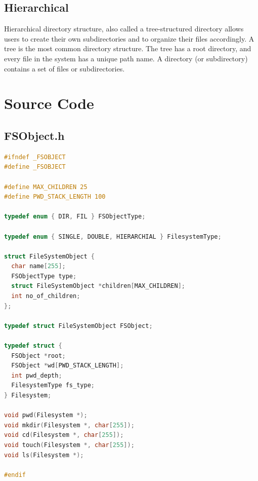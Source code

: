\documentclass[13pt,oneside]{book}
\begin{document}
\subsection{Hierarchical}
Hierarchical directory structure, also called a tree-structured directory allows
users to create their own subdirectories and to organize their files accordingly. A
tree is the most common directory structure. The tree has a root directory, and
every file in the system has a unique path name. A directory (or subdirectory)
contains a set of files or subdirectories.


\section*{Source Code}
\small
\subsection{FSObject.h}
\begin{lstlisting}[language=C]
#ifndef _FSOBJECT
#define _FSOBJECT

#define MAX_CHILDREN 25
#define PWD_STACK_LENGTH 100

typedef enum { DIR, FIL } FSObjectType;

typedef enum { SINGLE, DOUBLE, HIERARCHIAL } FilesystemType;

struct FileSystemObject {
  char name[255];
  FSObjectType type;
  struct FileSystemObject *children[MAX_CHILDREN];
  int no_of_children;
};

typedef struct FileSystemObject FSObject;

typedef struct {
  FSObject *root;
  FSObject *wd[PWD_STACK_LENGTH];
  int pwd_depth;
  FilesystemType fs_type;
} Filesystem;

void pwd(Filesystem *);
void mkdir(Filesystem *, char[255]);
void cd(Filesystem *, char[255]);
void touch(Filesystem *, char[255]);
void ls(Filesystem *);

#endif
    \end{lstlisting}
\end{document}
